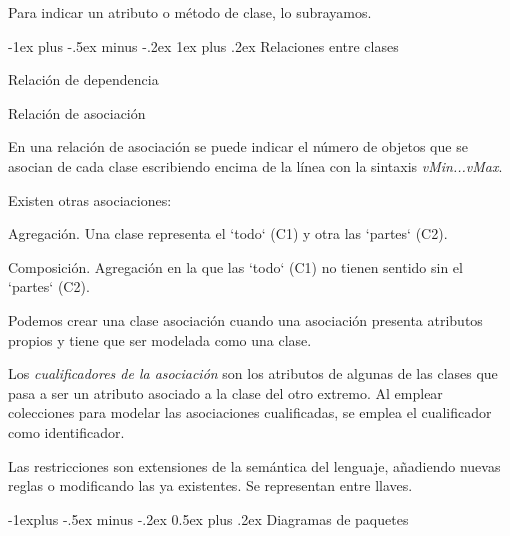 \documentclass[10pt,a4paper,landscape]{article}
\makeatletter
\renewcommand{\subsection}{\@startsection{subsection}{2}{0mm}%
                                {-1explus -.5ex minus -.2ex}%
                                {0.5ex plus .2ex}%
                                {\normalfont\normalsize\bfseries}}
\renewcommand{\subsubsection}{\@startsection{subsubsection}{3}{0mm}%
                                {-1ex plus -.5ex minus -.2ex}%
                                {1ex plus .2ex}%
                                {\normalfont\small\bfseries}}
\makeatother
\begin{document}
\begin{multicols}{3}
Para indicar un atributo o método de clase, lo subrayamos.

\subsubsection{Relaciones entre clases}


\hskip 4pt \parbox{4cm}{
   Relación de dependencia
}

\hskip 4pt \parbox{4cm}{
   Relación de asociación
}

En una relación de asociación se puede indicar el número de objetos que se
asocian de cada clase escribiendo encima de la línea con la sintaxis
\textit{vMin...vMax}.

Existen otras asociaciones:

\hskip 4pt \parbox{4cm}{
   Agregación. Una clase representa el `todo` (C1) y otra las `partes` (C2).
 }

\hskip 4pt \parbox{4cm}{
   Composición. Agregación en la que las `todo` (C1)  no tienen sentido sin el
   `partes` (C2).
 }

 Podemos crear una clase asociación cuando una asociación presenta atributos
 propios y tiene que ser modelada como una clase.

 Los \textit{cualificadores de la asociación} son los atributos de algunas de las clases
 que pasa a ser un atributo asociado a la clase del otro extremo. Al emplear
 colecciones para modelar las asociaciones cualificadas, se emplea el
 cualificador como identificador.

 Las restricciones son extensiones de la semántica del lenguaje, añadiendo
 nuevas reglas o modificando las ya existentes. Se representan entre llaves.

 \subsection{Diagramas de paquetes}



\end{multicols}
\end{document}
